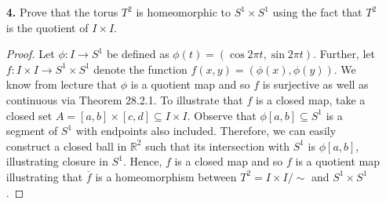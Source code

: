 \documentclass[ 12pt ]{article}
\begin{document}
\begin{enumerate}
	\item[\textbf{4.}] Prove that the torus $T^2$ is homeomorphic to $S^1 \times S^1$ using the fact that $T^2$ is the quotient of $I \times I$.

		\begin{proof}
			Let $\phi : I \to S^1$ be defined as $\phi(t) = ( \cos 2\pi t, \sin 2\pi t )$. Further, let $f : I \times I \to S^1 \times S^1$ denote the function $f(x, y) = (\phi(x),
			\phi(y))$. We know from lecture that $\phi$ is a quotient map and so $f$ is surjective as well as continuous via Theorem 28.2.1. To illustrate that $f$ is a closed map,
			take a closed set $A = [a, b] \times [c, d] \subseteq I \times I$. Observe that $\phi[a, b] \subseteq S^1$ is a segment of $S^1$ with endpoints also included. Therefore,
			we can easily construct a closed ball in $\mathbb{R}^2$ such that its intersection with $S^1$ is $\phi[a, b]$, illustrating closure in $S^1$. Hence, $f$ is a closed map
			and so $f$ is a quotient map illustrating that $\overline{f}$ is a homeomorphism between $T^2 = I \times I / \sim$ and $S^1 \times S^1$.
		\end{proof}


\end{enumerate}
\end{document}
